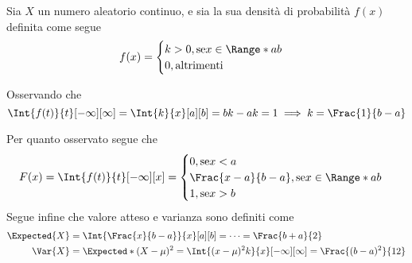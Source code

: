 \documentclass{subfiles}
\begin{document}
Sia $X$ un numero aleatorio continuo, e sia la sua densità di probabilità $f(x)$ definita come segue
$$
    f(x) = \begin{cases}
        k > 0, \text{se} x \in \Range*{a}{b} \\
        0, \text{altrimenti}
    \end{cases}$$
\begin{Remark*}
    Osservando che
    $$
        \Int{f(t)}{t}[-\infty][\infty] = \Int{k}{x}[a][b] = bk - ak = 1  \implies k = \Frac{1}{b - a}
    $$
\end{Remark*}
Per quanto osservato segue che
$$
    F(x) = \Int{f(t)}{t}[-\infty][x] = \begin{cases}
        0, \text{se} x < a                                 \\
        \Frac{x - a}{b - a}, \text{se} x \in \Range*{a}{b} \\
        1, \text{se} x > b
    \end{cases}$$
Segue infine che valore atteso e varianza sono definiti come
$$\begin{aligned}
        \Expected{X} & = \Int{\Frac{x}{b - a}}{x}[a][b] = \cdots = \Frac{b + a}{2}                                      \\
        \Var{X}      & = \Expected*{(X - \mu)^{2}} = \Int{(x - \mu)^{2} k}{x}[-\infty][\infty] = \Frac{(b - a)^{2}}{12}
    \end{aligned}$$
\end{document}
